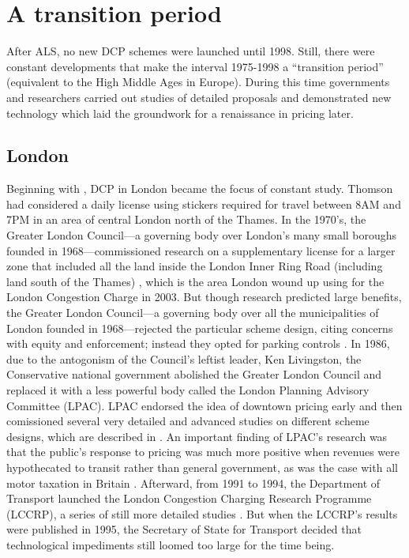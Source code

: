 \section{A transition period}\label{sec:transition}

After ALS, no new DCP schemes were launched until 1998. Still, there were constant developments that make the interval 1975-1998 a ``transition period'' (equivalent to the High Middle Ages in Europe). During this time governments and researchers carried out studies of detailed proposals and demonstrated new technology which laid the groundwork for a renaissance in pricing later.

\subsection{London}

Beginning with \citet{Thomson1967a}, DCP in London became the focus of constant study. Thomson had considered a daily license using stickers required for travel between 8AM and 7PM in an area of central London north of the Thames. In the 1970's, the Greater London Council---a governing body over London's many small boroughs founded in 1968---commissioned research on a supplementary license for a larger zone that included all the land inside the London Inner Ring Road (including land south of the Thames) \citep{may1975}, which is the area London wound up using for the London Congestion Charge in 2003. But though research predicted large benefits, the Greater London Council---a governing body over all the municipalities of London founded in 1968---rejected the particular scheme design, citing concerns with equity and enforcement; instead they opted for parking controls \citep{Richards2006}. In 1986, due to the antogonism of the Council's leftist leader, Ken Livingston, the Conservative national government abolished the Greater London Council and replaced it with a less powerful body called the London Planning Advisory Committee (LPAC). LPAC endorsed the idea of downtown pricing early and then comissioned several very detailed and advanced studies on different scheme designs, which are described in \citet[p. 51-54]{Gomez-Ibanez1994}. An important finding of LPAC's research was that the public's response to pricing was much more positive when revenues were hypothecated to transit rather than general government, as was the case with all motor taxation in Britain \citep[p. 51]{Richards2006}. Afterward, from 1991 to 1994, the Department of Transport launched the London Congestion Charging Research Programme (LCCRP), a series of still more detailed studies \citep{MVA1995,Richards1996}. But when the LCCRP's results were published in 1995, the Secretary of State for Transport decided that technological impediments still loomed too large for the time being.

